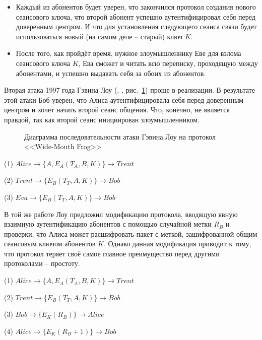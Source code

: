 \begin{itemize}
	\item Каждый из абонентов будет уверен, что закончился протокол создания нового сеансового ключа, что второй абонент успешно аутентифицировал себя перед доверенным центром. И что для установления следующего сеанса связи будет использоваться новый (на самом деле -- старый) ключ $K$.
	\item После того, как пройдёт время, нужное злоумышленнику Еве для взлома сеансового ключа $K$, Ева сможет и читать всю переписку, проходящую между абонентами, и успешно выдавать себя за обоих из абонентов.
\end{itemize}

Вторая атака 1997 года Гэвина Лоу (, \cite{Lowe:1997}, рис.~\ref{fig:key_distribution-wide-mouth_frog-lowe-attack}) проще в реализации. В результате этой атаки Боб уверен, что Алиса аутентифицировала себя перед доверенным центром и хочет начать второй сеанс общения. Что, конечно, не является правдой, так как второй сеанс инициирован злоумышленником.

\begin{figure}
	\centering
	\begin{sequencediagram}

	\end{sequencediagram}
	\caption{Диаграмма последовательности атаки Гэвина Лоу на протокол <<Wide-Mouth Frog>>\label{fig:key_distribution-wide-mouth_frog-lowe-attack}}
\end{figure}

\begin{protocol}
	\item[(1)] $Alice \to \{ A, E_A \left( T_A, B, K \right) \} \to Trent$
	\item[(2)] $Trent \to \{ E_B \left( T_T, A, K \right) \} \to Bob$
	\item[(3)] $Eva \to \{ E_B \left( T_T, A, K \right) \} \to Bob$
\end{protocol}

В той же работе Лоу предложил модификацию протокола, вводящую явную взаимную аутентификацию абонентов с помощью случайной метки $R_B$ и проверки, что Алиса может расшифровать пакет с меткой, зашифрованной общим сеансовым ключом абонентов $K$. Однако данная модификация приводит к тому, что протокол теряет своё самое главное преимущество перед другими протоколами -- простоту.

\begin{protocol}
	\item[(1)] $Alice \to \{ A, E_A \left( T_A, B, K \right) \} \to Trent$
	\item[(2)] $Trent \to \{ E_B \left( T_T, A, K \right) \} \to Bob$
	\item[(3)] $Bob \to \{ E_K \left( R_B \right) \} \to Alice$
	\item[(4)] $Alice \to \{ E_K \left( R_B + 1 \right) \} \to Bob$
\end{protocol}

